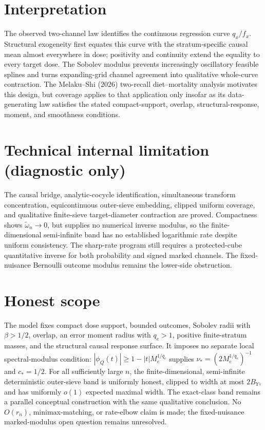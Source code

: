 \documentclass{article}
\begin{document}
\section{Interpretation}

The observed two-channel law identifies the continuous regression curve \(q_x/f_x\). Structural exogeneity first equates this curve with the stratum-specific causal mean almost everywhere in dose; positivity and continuity extend the equality to every target dose. The Sobolev modulus prevents increasingly oscillatory feasible splines and turns expanding-grid channel agreement into qualitative whole-curve contraction. The Melaku--Shi (2026) two-recall diet--mortality analysis motivates this design, but coverage applies to that application only insofar as its data-generating law satisfies the stated compact-support, overlap, structural-response, moment, and smoothness conditions.

\section*{Technical internal limitation (diagnostic only)}

The causal bridge, analytic-cocycle identification, simultaneous transform concentration, equicontinuous outer-sieve embedding, clipped uniform coverage, and qualitative finite-sieve target-diameter contraction are proved. Compactness shows \(\widetilde\omega_n\to0\), but supplies no numerical inverse modulus, so the finite-dimensional semi-infinite band has no established logarithmic rate despite uniform consistency. The sharp-rate program still requires a protected-cube quantitative inverse for both probability and signed marked channels. The fixed-nuisance Bernoulli outcome modulus remains the lower-side obstruction.

\section{Honest scope}

The model fixes compact dose support, bounded outcomes, Sobolev radii with \(\beta>1/2\), overlap, an error moment radius with \(q_e>1\), positive finite-stratum masses, and the structural causal response surface. It imposes no separate local spectral-modulus condition: \(|\phi_Q(t)|\ge1-|t|M_e^{1/q_e}\) supplies \(\nu_*=(2M_e^{1/q_e})^{-1}\) and \(c_*=1/2\). For all sufficiently large \(n\), the finite-dimensional, semi-infinite deterministic outer-sieve band is uniformly honest, clipped to width at most \(2B_Y\), and has uniformly \(o(1)\) expected maximal width. The exact-class band remains a parallel conceptual construction with the same qualitative conclusion. No \(O(r_n)\), minimax-matching, or rate-elbow claim is made; the fixed-nuisance marked-modulus open question remains unresolved.
\end{document}
